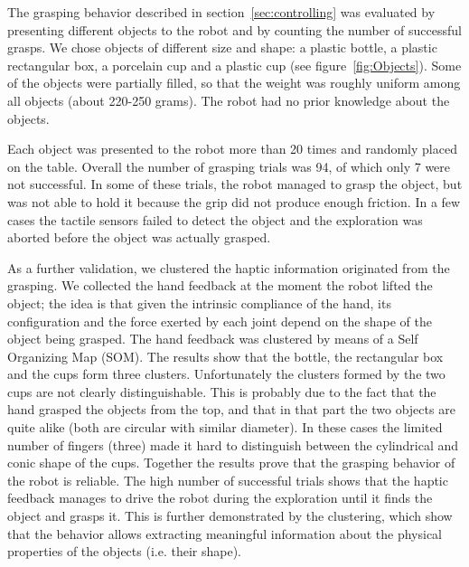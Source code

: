 

The grasping behavior described in section~\ref{sec:controlling}
was evaluated by presenting different objects to the robot and by
counting the number of successful grasps. We chose objects of
different size and shape: a plastic bottle, a plastic rectangular
box, a porcelain cup and a plastic cup (see
figure~\ref{fig:Objects}). Some of the objects were partially
filled, so that the weight was roughly uniform among all objects
(about 220-250 grams). The robot had no prior knowledge about the
objects.

Each object was presented to the robot more than 20 times and
randomly placed on the table. Overall the number of grasping
trials was 94, of which only 7 were not successful. In some of
these trials, the robot managed to grasp the object, but was not
able to hold it because the grip did not produce enough friction.
In a few cases the tactile sensors failed to detect the object and
the exploration was aborted before the object was actually
grasped.

As a further validation, we clustered the haptic information
originated from the grasping. We collected the hand feedback at
the moment the robot lifted the object; the idea is that given the
intrinsic compliance of the hand, its configuration and the force
exerted by each joint depend on the shape of the object being
grasped. The hand feedback was clustered by means of a Self
Organizing Map (SOM). The results show that the bottle, the
rectangular box and the cups form three clusters. Unfortunately
the clusters formed by the two cups are not clearly
distinguishable. This is probably due to the fact that the hand
grasped the objects from the top, and that in that part the two
objects are quite alike (both are circular with similar diameter).
In these cases the limited number of fingers (three) made it hard
to distinguish between the cylindrical and conic shape of the
cups. Together the results prove that the grasping behavior of the
robot is reliable. The high number of successful trials shows that
the haptic feedback manages to drive the robot during the
exploration until it finds the object and grasps it. This is
further demonstrated by the clustering, which show that the
behavior allows extracting meaningful information about the
physical properties of the objects (i.e. their shape).